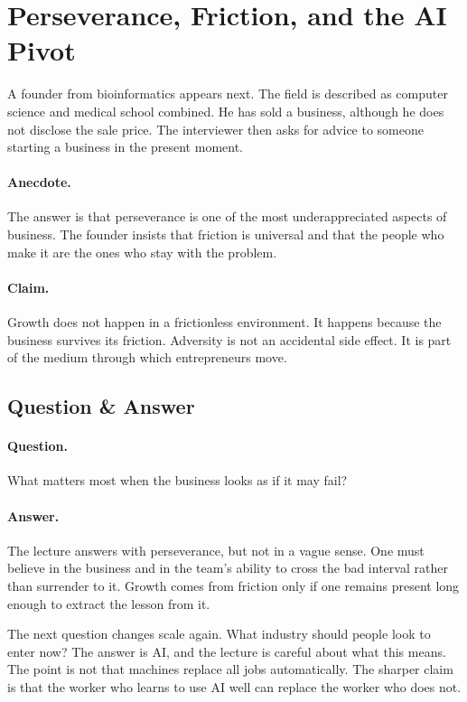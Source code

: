 \section{Perseverance, Friction, and the AI Pivot}

A founder from bioinformatics appears next. The field is described as computer science and medical school combined. He has sold a business, although he does not disclose the sale price. The interviewer then asks for advice to someone starting a business in the present moment.

\paragraph{Anecdote.}
The answer is that perseverance is one of the most underappreciated aspects of business. The founder insists that friction is universal and that the people who make it are the ones who stay with the problem.

\paragraph{Claim.}
Growth does not happen in a frictionless environment. It happens because the business survives its friction. Adversity is not an accidental side effect. It is part of the medium through which entrepreneurs move.

\subsection{Question \& Answer}

\paragraph{Question.}
What matters most when the business looks as if it may fail?

\paragraph{Answer.}
The lecture answers with perseverance, but not in a vague sense. One must believe in the business and in the team's ability to cross the bad interval rather than surrender to it. Growth comes from friction only if one remains present long enough to extract the lesson from it.

The next question changes scale again. What industry should people look to enter now? The answer is AI, and the lecture is careful about what this means. The point is not that machines replace all jobs automatically. The sharper claim is that the worker who learns to use AI well can replace the worker who does not.


